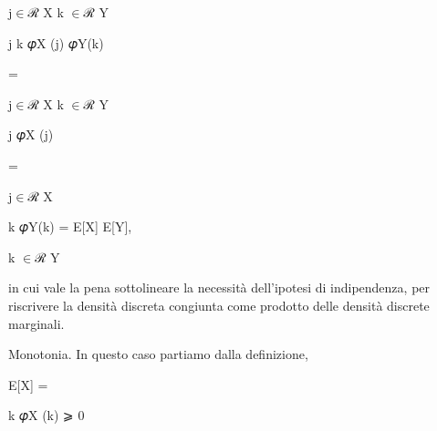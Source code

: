 \documentclass[a4paper,portrait,12pt]{article}
\begin{document}
\begin{flushleft}
j$\in$ℛ X k $\in$ℛ Y
\end{flushleft}





\begin{flushleft}
j k 𝜑X (j) 𝜑Y(k)
\end{flushleft}





=


\begin{flushleft}
j$\in$ℛ X k $\in$ℛ Y
\end{flushleft}





\begin{flushleft}
j 𝜑X (j)
\end{flushleft}





=


\begin{flushleft}
j$\in$ℛ X
\end{flushleft}





\begin{flushleft}
k 𝜑Y(k) = E[X] E[Y],
\end{flushleft}


\begin{flushleft}
k $\in$ℛ Y
\end{flushleft}





\begin{flushleft}
in cui vale la pena sottolineare la necessit\`{a} dell'ipotesi di indipendenza, per riscrivere la densit\`{a} discreta congiunta come prodotto delle densit\`{a} discrete marginali.
\end{flushleft}


\begin{flushleft}
Monotonia. In questo caso partiamo dalla definizione,
\end{flushleft}


\begin{flushleft}
E[X] =
\end{flushleft}





\begin{flushleft}
k 𝜑X (k) ⩾ 0
\end{flushleft}
\end{document}
